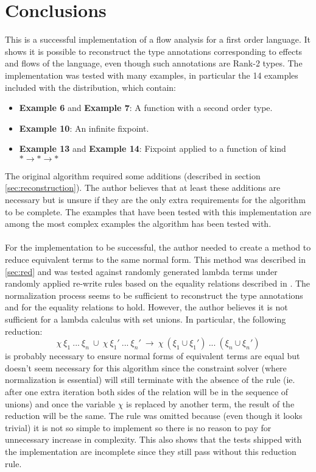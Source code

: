 \documentclass[8pt]{extarticle}
\begin{document}
\section{Conclusions}
This is a successful implementation of a flow analysis for a first order language. It shows it is possible to reconstruct the type annotations corresponding to effects and flows of the language, even though such annotations are Rank-2 types. The implementation was tested with many examples, in particular the 14 examples included with the distribution, which contain:
\begin{itemize}
\item {\bf Example 6} and {\bf Example 7}: A function with a second order type.
\item {\bf Example 10}: An infinite fixpoint.
\item {\bf Example 13} and {\bf Example 14}: Fixpoint applied to a function of kind $*\to * \to *$
\end{itemize}
The original algorithm required some additions (described in section \ref{sec:reconstruction}). The author believes that at least these additions are necessary but is unsure if they are the only extra requirements for the algorithm to be complete. The examples that have been tested with this implementation are among the most complex examples the algorithm has been tested with.
\\\\
For the implementation to be successful, the author needed to create a method to reduce equivalent terms to the same normal form. This method was described in \ref{sec:red} and was tested against randomly generated lambda terms under randomly applied re-write rules based on the equality relations described in \cite{analysis}. The normalization process seems to be sufficient to reconstruct the type annotations and for the equality relations to hold. However, the author believes it is not sufficient for a lambda calculus with set unions. In particular, the following reduction:
\[
\chi\ \xi_1\ ...\ \xi_n\ \cup\ \chi\ \xi_1'\ ...\ \xi_n'\ \to\ \chi\ \left(\xi_1\cup\xi_1'\right)\ ...\ \left(\xi_n\cup\xi_n'\right)
\]
is probably necessary to ensure normal forms of equivalent terms are equal but doesn't seem necessary for this algorithm since the constraint solver (where normalization is essential) will still terminate with the absence of the rule (ie. after one extra iteration both sides of the relation will be in the sequence of unions) and once the variable $\chi$ is replaced by another term, the result of the reduction will be the same. The rule was omitted because (even though it looks trivial) it is not so simple to implement so there is no reason to pay for unnecessary increase in complexity. This also shows that the tests shipped with the implementation are incomplete since they still pass without this reduction rule.
\end{document}
